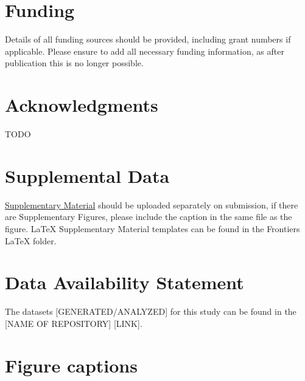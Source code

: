 \documentclass[utf8]{frontiersSCNS} %
\begin{document}
\section*{Funding}
Details of all funding sources should be provided, including grant numbers if applicable. Please ensure to add all necessary funding information, as after publication this is no longer possible.

\section*{Acknowledgments}

TODO

\section*{Supplemental Data}
\href{http://home.frontiersin.org/about/author-guidelines#SupplementaryMaterial}{Supplementary Material} should be uploaded separately on submission, if there are Supplementary Figures, please include the caption in the same file as the figure. LaTeX Supplementary Material templates can be found in the Frontiers LaTeX folder.

\section*{Data Availability Statement}
The datasets [GENERATED/ANALYZED] for this study can be found in the [NAME OF REPOSITORY] [LINK].

\clearpage



\clearpage
\section*{Figure captions}

\end{document}
